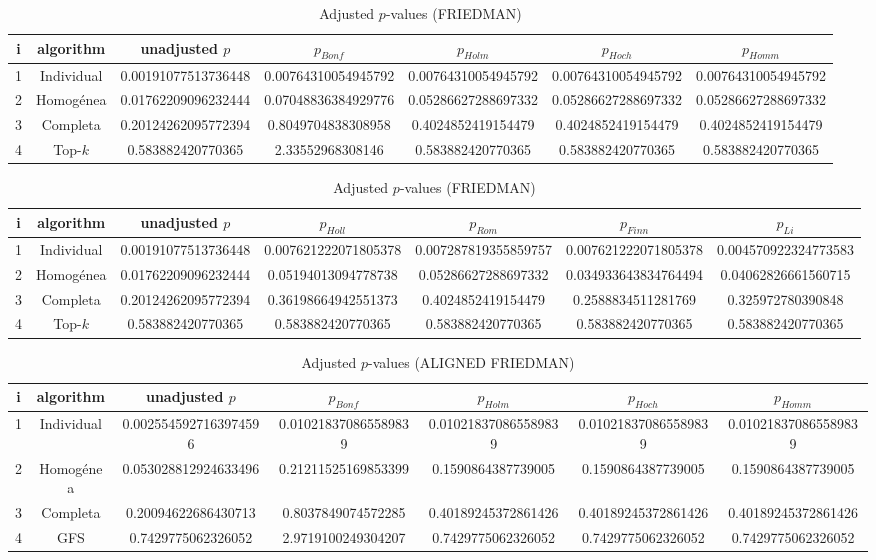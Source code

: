 \documentclass[a4paper,10pt]{article}
\begin{document}
\begin{landscape}
\begin{table}[!htp]
\centering\scriptsize
\caption{Adjusted $p$-values (FRIEDMAN)}
\begin{tabular}{ccccccc}
i&algorithm&unadjusted $p$&$p_{Bonf}$&$p_{Holm}$&$p_{Hoch}$&$p_{Homm}$\\
\hline
1&Individual&0.00191077513736448&0.00764310054945792&0.00764310054945792&0.00764310054945792&0.00764310054945792\\
2&Homogénea&0.01762209096232444&0.07048836384929776&0.05286627288697332&0.05286627288697332&0.05286627288697332\\
3&Completa&0.20124262095772394&0.8049704838308958&0.4024852419154479&0.4024852419154479&0.4024852419154479\\
4&Top-$k$&0.583882420770365&2.33552968308146&0.583882420770365&0.583882420770365&0.583882420770365\\
\hline
\end{tabular}
\end{table}

\begin{table}[!htp]
\centering\scriptsize
\caption{Adjusted $p$-values (FRIEDMAN)}
\begin{tabular}{ccccccc}
i&algorithm&unadjusted $p$&$p_{Holl}$&$p_{Rom}$&$p_{Finn}$&$p_{Li}$\\
\hline
1&Individual&0.00191077513736448&0.007621222071805378&0.007287819355859757&0.007621222071805378&0.004570922324773583\\
2&Homogénea&0.01762209096232444&0.05194013094778738&0.05286627288697332&0.034933643834764494&0.04062826661560715\\
3&Completa&0.20124262095772394&0.36198664942551373&0.4024852419154479&0.2588834511281769&0.325972780390848\\
4&Top-$k$&0.583882420770365&0.583882420770365&0.583882420770365&0.583882420770365&0.583882420770365\\
\hline
\end{tabular}
\end{table}


\newpage

\begin{table}[!htp]
\centering\scriptsize
\caption{Adjusted $p$-values (ALIGNED FRIEDMAN)}
\begin{tabular}{ccccccc}
i&algorithm&unadjusted $p$&$p_{Bonf}$&$p_{Holm}$&$p_{Hoch}$&$p_{Homm}$\\
\hline
1&Individual&0.0025545927163974596&0.010218370865589839&0.010218370865589839&0.010218370865589839&0.010218370865589839\\
2&Homogénea&0.053028812924633496&0.21211525169853399&0.1590864387739005&0.1590864387739005&0.1590864387739005\\
3&Completa&0.20094622686430713&0.8037849074572285&0.40189245372861426&0.40189245372861426&0.40189245372861426\\
4&GFS&0.7429775062326052&2.9719100249304207&0.7429775062326052&0.7429775062326052&0.7429775062326052\\
\hline
\end{tabular}
\end{table}


\end{landscape}
\end{document}
